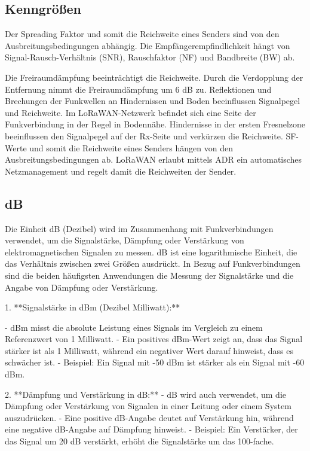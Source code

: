 \documentclass[12pt,a4paper]{article}
\begin{document}
\subsection{Kenngrößen}

Der Spreading Faktor und somit die Reichweite eines Senders sind von den Ausbreitungsbedingungen abhängig.
Die Empfängerempfindlichkeit hängt von Signal-Rausch-Verhältnis (SNR), Rauschfaktor (NF) und Bandbreite (BW) ab.

Die Freiraumdämpfung beeinträchtigt die Reichweite. Durch die Verdopplung der Entfernung nimmt die Freiraumdämpfung um 6 dB zu.
Reflektionen und Brechungen der Funkwellen an Hindernissen und Boden beeinflussen Signalpegel und Reichweite. Im LoRaWAN-Netzwerk befindet sich eine Seite der Funkverbindung in der Regel in Bodennähe.
Hindernisse in der ersten Fresnelzone beeinflussen den Signalpegel auf der Rx-Seite und verkürzen die Reichweite.
SF-Werte und somit die Reichweite eines Senders hängen von den Ausbreitungsbedingungen ab. LoRaWAN erlaubt mittels ADR ein automatisches Netzmanagement und regelt damit die Reichweiten der Sender.

\subsection{dB}

Die Einheit dB (Dezibel) wird im Zusammenhang mit Funkverbindungen verwendet, um die Signalstärke, Dämpfung oder Verstärkung von elektromagnetischen Signalen zu messen. dB ist eine logarithmische Einheit, die das Verhältnis zwischen zwei Größen ausdrückt. In Bezug auf Funkverbindungen sind die beiden häufigsten Anwendungen die Messung der Signalstärke und die Angabe von Dämpfung oder Verstärkung.

1. **Signalstärke in dBm (Dezibel Milliwatt):**

   - dBm misst die absolute Leistung eines Signals im Vergleich zu einem Referenzwert von 1 Milliwatt.
   - Ein positives dBm-Wert zeigt an, dass das Signal stärker ist als 1 Milliwatt, während ein negativer Wert darauf hinweist, dass es schwächer ist.
   - Beispiel: Ein Signal mit -50 dBm ist stärker als ein Signal mit -60 dBm.

2. **Dämpfung und Verstärkung in dB:**
   - dB wird auch verwendet, um die Dämpfung oder Verstärkung von Signalen in einer Leitung oder einem System auszudrücken.
   - Eine positive dB-Angabe deutet auf Verstärkung hin, während eine negative dB-Angabe auf Dämpfung hinweist.
   - Beispiel: Ein Verstärker, der das Signal um 20 dB verstärkt, erhöht die Signalstärke um das 100-fache.
\end{document}
